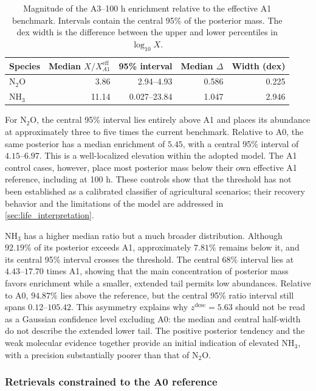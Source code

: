 \begin{table}[t!]
\centering
\caption{Magnitude of the A3--100 h enrichment relative to the effective A1 benchmark. Intervals contain the central 95\% of the posterior mass. The dex width is the difference between the upper and lower percentiles in $\log_{10}X$.}
\label{tab:life_a3_enrichment}
\begin{tabular}{lrrrr}
\hline
Species & Median $X/X_{A1}^{\mathrm{eff}}$ & 95\% interval & Median $\Delta$ & Width (dex) \\
\hline
$\mathrm{N_2O}$ & 3.86 & 2.94--4.93 & 0.586 & 0.225 \\
$\mathrm{NH_3}$ & 11.14 & 0.027--23.84 & 1.047 & 2.946 \\
\hline
\end{tabular}
\end{table}

For $\mathrm{N_2O}$, the central 95\% interval lies entirely above A1 and places its abundance at approximately three to five times the current benchmark. Relative to A0, the same posterior has a median enrichment of $5.45$, with a central 95\% interval of $4.15$--$6.97$. This is a well-localized elevation within the adopted model. The A1 control cases, however, place most posterior mass below their own effective A1 reference, including at 100 h. These controls show that the threshold has not been established as a calibrated classifier of agricultural scenarios; their recovery behavior and the limitations of the model are addressed in \autoref{sec:life_interpretation}.

$\mathrm{NH_3}$ has a higher median ratio but a much broader distribution. Although $92.19\%$ of its posterior exceeds A1, approximately $7.81\%$ remains below it, and its central 95\% interval crosses the threshold. The central 68\% interval lies at $4.43$--$17.70$ times A1, showing that the main concentration of posterior mass favors enrichment while a smaller, extended tail permits low abundances. Relative to A0, $94.87\%$ lies above the reference, but the central 95\% ratio interval still spans $0.12$--$105.42$. This asymmetry explains why $z^{\mathrm{desc}}=5.63$ should not be read as a Gaussian confidence level excluding A0: the median and central half-width do not describe the extended lower tail. The positive posterior tendency and the weak molecular evidence together provide an initial indication of elevated $\mathrm{NH_3}$, with a precision substantially poorer than that of $\mathrm{N_2O}$.

\subsubsection{Retrievals constrained to the A0 reference}
\label{sec:life_a0_constraints}

